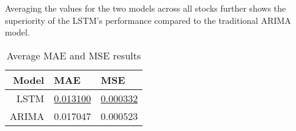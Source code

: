 Averaging the values for the two models across all stocks further shows the superiority of the LSTM's performance compared to the traditional ARIMA model.

\begin{table}[H]
    \centering
    \begin{tabular}{r|l|l}
        \hline
        \textbf{Model}      & \textbf{MAE} & \textbf{MSE} \\ 
        \hline
        LSTM & \underline{0.013100} & \underline{0.000332}\\
        \hline
        ARIMA & 0.017047 & 0.000523\\
    \end{tabular}
    \caption{Average MAE and MSE results}
    \label{tab:averaqe_error_values_models}
\end{table}

